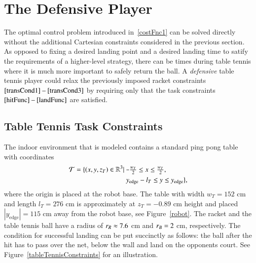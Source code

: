 \section{The Defensive Player}\label{method2}

The optimal control problem introduced in~\eqref{costFnc1} can be solved directly without the additional Cartesian constraints considered in the previous section. As opposed to fixing a desired landing point and a desired landing time to satify the requirements of a higher-level strategy, there can be times during table tennis where it is much more important to safely return the ball. A \emph{defensive} table tennis player could relax the previously imposed racket constraints $\mbox{\eqref{transCond1} -- \eqref{transCond3}}$ by requiring only that the task constraints $\mbox{\eqref{hitFunc} -- \eqref{landFunc}}$ are satisfied.
%
\subsection{Table Tennis Task Constraints}
%
The indoor environment that is modeled contains a standard ping pong table with coordinates 
%
\begin{equation}
\begin{aligned}
\tabletennis = \{(x,y, \ztable) \in \mathbb{R}^{3} | & \ \scalebox{0.75}[1.0]{\( - \)}\tfrac{w_{T}}{2} \leq x \leq \tfrac{w_{T}}{2}, \\
& \ y_{\mathrm{edge}} - l_{T} \leq y \leq y_{\mathrm{edge}} \},
\end{aligned}
\end{equation}
%
\noindent where the origin is placed at the robot base. The table with width $w_T = 152$ cm and length $l_T = 276$ cm is approximately at $z_{T} = -0.89$ cm height and placed $|y_{\mathrm{edge}}| = 115$ cm away from the robot base, see Figure~\ref{robot}. The racket and the table tennis ball have a radius of $r_{R} \approx 7.6 $ cm and $r_{B} = 2$ cm, respectively. The condition for successful landing can be put succinctly as follows: the ball after the hit has to pass over the net, below the wall and land on the opponents court. See Figure~\ref{tableTennisConstraints} for an illustration. %
%
